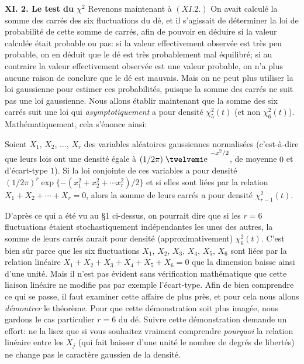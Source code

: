 {\bf XI. 2. Le test du $\chi^2$}
\medskip
Revenons maintenant \`a $(XI.2.)$ On avait calcul\'e la somme des 
carr\'es des six fluctuations du d\'e, et il s'agissait de d\'eterminer la
loi de probabilit\'e de cette somme de carr\'es, afin de pouvoir en 
d\'eduire si la valeur calcul\'ee \'etait probable ou pas: si la valeur
effectivement observ\'ee est tr\`es peu probable, on en d\'eduit que le
d\'e est tr\`es probablement mal \'equilibr\'e; si au contraire la valeur
effectivement observ\'ee est une valeur probable, on n'a plus aucune 
raison de conclure que le d\'e est mauvais. Mais on ne peut plus utiliser 
la loi gaussienne pour estimer ces probabilit\'es, puisque la somme des
carr\'es ne suit pas une loi gaussienne. Nous allons \'etablir maintenant
que la somme des six carr\'es suit une loi qui {\it asymptotiquement} a
pour densit\'e $\chi_5^2(t)$ (et non $\chi_6^2(t)$). Math\'ematiquement,
cela s'\'enonce ainsi:
\medskip
{ Soient $X_1$, $X_2$, $\ldots$, $X_r$ des
variables al\'eatoires gaus\-siennes normalis\'ees (c'est-\`a-dire
que leurs lois ont une densit\'e \'egale \`a $(1/2\pi )\; \e^{-x^2/2}$, 
de moyenne $0$ et
d'\'ecart-type $1$). Si la loi conjointe de ces variables a pour densit\'e
$(1/2\pi )^r\exp\{ -(x_1^2 + x_2^2 + \cdots x_r^2)/2\}$ et si elles sont
li\'ees par la relation $X_1 + X_2 + \cdots + X_r = 0$, alors la somme 
de leurs carr\'es a pour densit\'e $\chi_{r-1}^2(t)$. \par }
\medskip
D'apr\`es ce qui a \'et\'e vu au \S 1 ci-dessus, on pourrait dire que 
si les $r = 6$ fluctuations \'etaient stochastiquement ind\'ependantes
les unes des autres, la somme de leurs carr\'es aurait pour densit\'e
(approximativement) $\chi_6^2(t)$. C'est bien s\^ur parce que les six
fluctuations $X_1,\,  X_2,\, X_3,\, X_4,\, X_5,\, X_6$ sont li\'ees
par la relation lin\'eaire $X_1 + X_2 + X_3 + X_4 + X_5 + X_6 = 0$ que 
la dimension baisse ainsi d'une unit\'e. Mais il n'est pas \'evident 
sans v\'erification math\'ematique que cette liaison lin\'eaire ne modifie
pas par exemple l'\'ecart-type. Afin de bien comprendre ce qui se passe, 
il faut examiner cette affaire de plus pr\`es, et pour cela nous allons
{\it d\'emontrer} le th\'eor\`eme. Pour que cette d\'emonstration soit plus
imag\'ee, nous gardons le cas particulier $r=6$ du d\'e.
\medskip
Suivre cette d\'emonstration demande un effort: ne la lisez que si vous
souhaitez vraiment comprendre {\it pourquoi} la relation lin\'eaire entre
les $X_j$ (qui fait baisser d'une unit\'e le nombre de degr\'es de libert\'es)
ne change pas le caract\`ere gaussien de la densit\'e.
